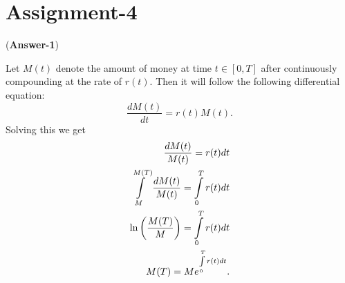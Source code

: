 \documentclass[11pt,twoside,reqno]{article}
\newcommand{\s}{\sigma}
\newcommand{\p}{\partial}
\begin{document}
\begin{comment}
&=& \frac{\p f}{\p t} dt + \frac{\p f}{\p X_t} (\mu X_t dt + \s X_t dB(t)) + \frac{1}{2} \frac{\p^2 f}{\p X_t^2} (\mu X_t dt + \s X_t dB(t))^2 \\
&=& \frac{\p f}{\p t} dt + \frac{\p f}{\p X_t} (\mu X_t dt + \s X_t dB(t)) + \frac{1}{2} \frac{\p^2 f}{\p X_t^2} \s^2 X_t^2 dt \\
&=& \left( \frac{\p f}{\p t} + \frac{\p f}{\p X_t} \mu X_t + \frac{1}{2} \frac{\p^2 f}{\p X_t^2} \s^2 X_t^2 \right)dt + \frac{\p f}{\p X_t}  \s X_t dB(t)\\
\end{eqnarray*}
\begin{enumerate}
\item[(a)] Let $f(S_t, t) = S_t^2.$ In this case, we have $\frac{\p f}{\p t} = 0, \frac{\p f}{\p S_t} = 2S_t,$ and $ \frac{\p^2 f}{\p S_t^2} = 2$. Substituting these values in the above 
equation we get 
\begin{eqnarray*}
df &=&  (2\mu S_t^2 + \s^2 S_t^2 )dt + 2\s S_t^2 dB(t) \\
&=& S_t^2((2\mu + \s^2)dt + 2 \s dB(t)).
\end{eqnarray*}
\end{enumerate}
\end{itemize}
\end{comment}




\section{Assignment-4}

({\bf Answer-1})

Let $M(t)$ denote the amount of money at time $t \in [0, T]$ after continuously compounding at the rate of $r(t)$. Then it will follow the following differential equation:
\[
\frac{dM(t)}{dt} = r(t) M(t).
\]
Solving this we get
\begin{eqnarray*}
\frac{dM(t)}{M(t)} = r(t) dt \\
\int\limits_{M}^{M(T)} \frac{dM(t)}{M(t)} = \int\limits_{0}^T r(t) dt \\
{\rm ln}\left(\frac{M(T)}{M}\right) = \int\limits_{0}^T r(t) dt \\
M(T) = M e^{\int\limits_{0}^T r(t) dt}.
\end{eqnarray*}
\end{document}
